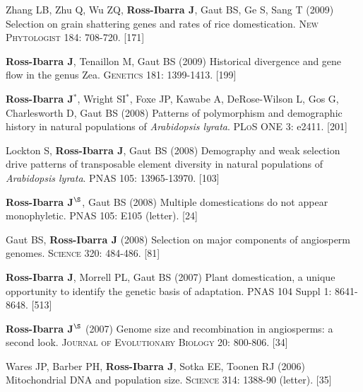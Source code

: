 \documentclass[letterpaper,10pt]{article}
\begin{document}
\begin{etaremune}
\item Zhang LB, Zhu Q, Wu ZQ, {\bf Ross-Ibarra J}, Gaut BS, Ge S, Sang T (2009) Selection on grain shattering genes and rates of rice domestication.  \textsc{New Phytologist} 184: 708-720.
 [171]\\

\item {\bf Ross-Ibarra J}, Tenaillon M, Gaut BS (2009) Historical divergence and gene flow in the genus Zea.  \textsc{Genetics} 181: 1399-1413.
 [199]\\


\item {\bf Ross-Ibarra J}$^*$, Wright SI$^*$, Foxe JP, Kawabe A, DeRose-Wilson L, Gos G, Charlesworth D, Gaut BS (2008) Patterns of polymorphism and demographic history in natural populations of \emph{Arabidopsis lyrata}.  \textsc{PLoS ONE} 3: e2411.
 [201]\\


\item Lockton S, {\bf Ross-Ibarra J}, Gaut BS (2008) Demography and weak selection drive patterns of transposable element diversity in natural populations of \emph{Arabidopsis lyrata}. PNAS 105: 13965-13970.
 [103]\\


\item {\bf Ross-Ibarra J}$^\S$, Gaut BS (2008) Multiple domestications do not appear monophyletic. PNAS 105: E105 (letter).
 [24]\\


\item Gaut BS, {\bf Ross-Ibarra J} (2008) Selection on major components of angiosperm genomes.  \textsc{Science} 320: 484-486.
 [81]\\


\item {\bf Ross-Ibarra J}, Morrell PL, Gaut BS (2007) Plant domestication, a unique opportunity to identify the genetic basis of adaptation. PNAS 104 Suppl 1: 8641-8648.
 [513]\\


\item {\bf Ross-Ibarra J}$^\S$ (2007) Genome size and recombination in angiosperms: a second look.  \textsc{Journal of Evolutionary Biology} 20: 800-806.
 [34]\\


\item Wares JP, Barber PH, {\bf Ross-Ibarra J}, Sotka EE, Toonen RJ (2006) Mitochondrial DNA and population size.  \textsc{Science} 314: 1388-90 (letter).
 [35]\\



\end{etaremune}
\end{document}
